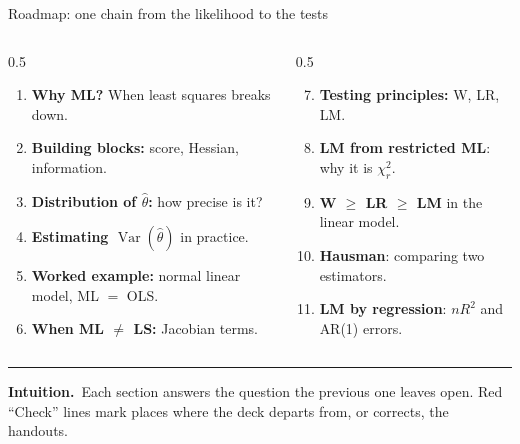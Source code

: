 \documentclass[aspectratio=169,11pt,t]{beamer}
\DeclareMathOperator{\Var}{Var}
\newcommand{\hth}{\hat\theta}
\newcommand{\intuition}[1]{\par\vfill
  {\color{intu}\rule{\linewidth}{0.4pt}}\par\vspace{1pt}
  {\small\color{intu}\textbf{Intuition.}\ #1}\par\vspace{2pt}}
\begin{document}
\begin{frame}{Roadmap: one chain from the likelihood to the tests}
\vspace{6pt}
\footnotesize
\begin{columns}[T,onlytextwidth]
\begin{column}{0.5\textwidth}
\begin{enumerate}
 \item \textbf{Why ML?} When least squares breaks down.
 \item \textbf{Building blocks:} score, Hessian, information.
 \item \textbf{Distribution of $\hth$:} how precise is it?
 \item \textbf{Estimating $\Var(\hth)$} in practice.
 \item \textbf{Worked example:} normal linear model, ML $=$ OLS.
 \item \textbf{When ML $\neq$ LS:} Jacobian terms.
\end{enumerate}
\end{column}
\begin{column}{0.5\textwidth}
\begin{enumerate}\setcounter{enumi}{6}
 \item \textbf{Testing principles:} W, LR, LM.
 \item \textbf{LM from restricted ML}: why it is $\chi^{2}_{r}$.
 \item \textbf{W $\ge$ LR $\ge$ LM} in the linear model.
 \item \textbf{Hausman}: comparing two estimators.
 \item \textbf{LM by regression}: $nR^{2}$ and AR(1) errors.
\end{enumerate}
\end{column}
\end{columns}
\intuition{Each section answers the question the previous one leaves open. Red ``Check'' lines mark places where the deck departs from, or corrects, the handouts.}
\end{frame}
\end{document}
